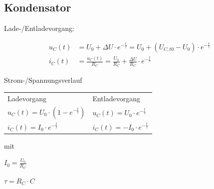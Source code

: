 \begin{sectionbox}
	\subsection{Kondensator}

	Lade-/Entladevorgang:
	\begin{emphbox}
		\begin{align*}
			u_C(t) &= U_0+ ΔU \cdot e^{-{\frac{t}{τ}}} = U_0+ (U_{C,t0}-U_0) \cdot e^{-{\frac{t}{τ}}} \\
			i_C(t) &= \frac{u_C(t)}{R_C} = \frac{U_0}{R_C}+\frac{ΔU}{R_C}\cdot e^{-{\frac{t}{τ}}}
		\end{align*}
	\end{emphbox}


Strom-/Spannungsverlauf



%
%



\begin{emphbox}
	\begin{tabular}{l|l}
		Ladevorgang & Entladevorgang \\
		
		$ u_C(t) = U_0 \cdot (1-e^{-{\frac{t}{τ}}}) $ &
		$ u_C(t) = U_0 \cdot e^{-{\frac{t}{τ}}} $ \\

		$ i_C(t) = I_0 \cdot e^{-{\frac{t}{τ}}} $ &
		$ i_C(t) = -I_0 \cdot e^{-{\frac{t}{τ}}} $ \\
		
	\end{tabular}



\end{emphbox}

mit
\begin{emphbox}
	$I_0 = \frac{U_0}{R_C}$
	
	$τ = R_C \cdot C$
\end{emphbox}

	
\end{sectionbox}

